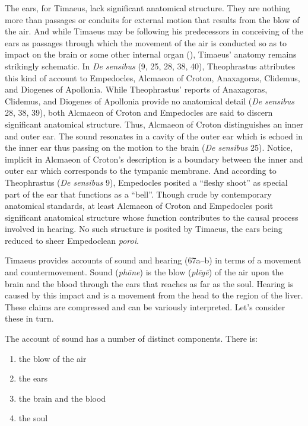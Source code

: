 The ears, for Timaeus, lack significant anatomical structure. They are nothing more than passages or conduits for external motion that results from the blow of the air. And while Timaeus may be following his predecessors in conceiving of the ears as passages through which the movement of the air is conducted so as to impact on the brain or some other internal organ (\citealt[94]{Beare:1906uq}), Timaeus' anatomy remains strikingly schematic. In \emph{De sensibus} (9, 25, 28, 38, 40), Theophrastus attributes this kind of account to Empedocles, Alcmaeon of Croton, Anaxagoras, Clidemus, and Diogenes of Apollonia. While Theophrastus' reports of Anaxagoras, Clidemus, and Diogenes of Apollonia provide no anatomical detail (\emph{De sensibus} 28, 38, 39), both Alcmaeon of Croton and Empedocles are said to discern significant anatomical structure. Thus, Alcmaeon of Croton distinguishes an inner and outer ear. The sound resonates in a cavity of the outer ear which is echoed in the inner ear thus passing on the motion to the brain (\emph{De sensibus} 25). Notice, implicit in Alcmaeon of Croton's description is a boundary between the inner and outer ear which corresponds to the tympanic membrane. And according to Theophrastus (\emph{De sensibus} 9), Empedocles posited a ``fleshy shoot'' as special part of the ear that functions as a ``bell''. Though crude by contemporary anatomical standards, at least Alcmaeon of Croton and Empedocles posit significant anatomical structure whose function contributes to the causal process involved in hearing. No such structure is posited by Timaeus, the ears being reduced to sheer Empedoclean \emph{poroi}.

Timaeus provides accounts of sound and hearing (67a--b) in terms of a movement and countermovement. Sound (\emph{phōne}) is the blow (\emph{plēgē}) of the air upon the brain and the blood through the ears that reaches as far as the soul. Hearing is caused by this impact and is a movement from the head to the region of the liver. These claims are compressed and can be variously interpreted. Let's consider these in turn.

The account of sound has a number of distinct components. There is:
\begin{enumerate}
	\item the blow of the air
	\item the ears
	\item the brain and the blood
	\item the soul
\end{enumerate}

